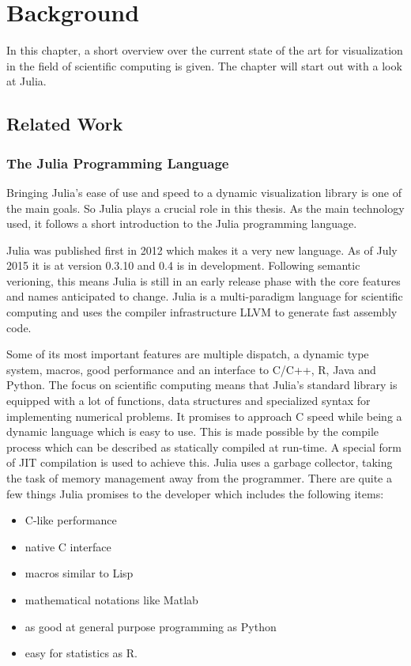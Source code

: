 \section{Background}

In this chapter, a short overview over the current state of the art for visualization in the field of scientific computing is given. The chapter will start out with a look at Julia.

\subsection{Related Work}

\subsubsection{The Julia Programming Language}

Bringing Julia's ease of use and speed to a dynamic visualization library is one of the main goals.
So Julia plays a crucial role in this thesis. 
As the main technology used, it follows a short introduction to the Julia programming language.

Julia was published first in 2012 which makes it a very new language. 
As of July 2015 it is at version 0.3.10 and 0.4 is in development.
Following semantic verioning, this means Julia is still in an early release phase with the core features and names anticipated to change\cite{semver}.
Julia is a multi-paradigm language for scientific computing and uses the compiler infrastructure \ac{LLVM} to generate fast assembly code.

Some of its most important features are multiple dispatch, a dynamic type system, macros, good performance and an interface to C/C++, R, Java and Python.
The focus on scientific computing means that Julia's standard library is equipped with a lot of functions, data structures and specialized syntax for implementing numerical problems.
It promises to approach C speed while being a dynamic language which is easy to use.
This is made possible by the compile process which can be described as statically compiled at run-time. A special form of \ac{JIT} compilation is used to achieve this.
Julia uses a garbage collector, taking the task of memory management away from the programmer.
There are quite a few things Julia promises to the developer which includes the following items\cite{WhyJulia}:

\begin{itemize}
	\item C-like performance
	\item native C interface
	\item macros similar to Lisp
	\item mathematical notations like Matlab
	\item as good at general purpose programming as Python
	\item easy for statistics as R.
\end{itemize}

